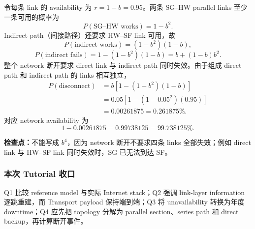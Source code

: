 \begin{checkedsolution}
令每条 link 的 availability 为 $r=1-b=0.95$。两条 SG--HW parallel links 至少一条可用的概率为
\[
  P(\text{SG--HW works})=1-b^2.
\]
Indirect path（间接路径）还要求 HW--SF link 可用，故
\[
  P(\text{indirect works})=(1-b^2)(1-b),
\]
\[
  P(\text{indirect fails})=1-(1-b^2)(1-b)
  =b+(1-b)b^2.
\]
整个 network 断开要求 direct link 与 indirect path 同时失效。由于组成 direct path 和 indirect path 的 links 相互独立，
\begin{align*}
  P(\text{disconnect})
    &=b\left[1-(1-b^2)(1-b)\right]\\
    &=0.05\left[1-(1-0.05^2)(0.95)\right]\\
    &=\boxed{0.00261875}
     =\boxed{0.261875\%}.
\end{align*}
对应 network availability 为
\[
  \boxed{1-0.00261875=0.99738125=99.738125\%}.
\]
\end{checkedsolution}

\textbf{检查点：}不能写成 $b^4$，因为 network 断开不要求四条 links 全部失效；例如 direct link 与 HW--SF link 同时失效时，SG 已无法到达 SF。

\subsubsection*{本次 Tutorial 收口}

Q1 比较 reference model 与实际 Internet stack；Q2 强调 link-layer information 逐跳重建，而 Transport payload 保持端到端；Q3 将 unavailability 转换为年度 downtime；Q4 应先把 topology 分解为 parallel section、series path 和 direct backup，再计算断开事件。
